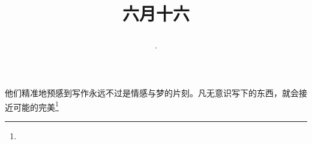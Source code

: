\title{\date[d=21,m=7,y=2024][year:cn-y,年,month:cn,day:cn,日,·,weekday]·六月十六 }
他们精准地预感到写作永远不过是情感与梦的片刻。凡无意识写下的东西，就会接近可能的完美\footnote{ }

